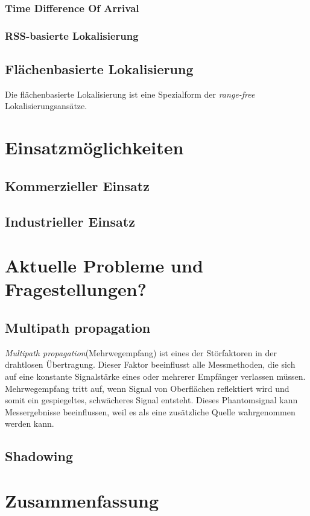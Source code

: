 \documentclass[12pt, a4wide]{scrreprt}
\begin{document}
    \subsection{Time Difference Of Arrival}
    \subsection{RSS-basierte Lokalisierung}    
  \section{Flächenbasierte Lokalisierung}
Die flächenbasierte Lokalisierung ist eine Spezialform der \textit{range-free} Lokalisierungsansätze.
\chapter{Einsatzmöglichkeiten}
  \section{Kommerzieller Einsatz}
  \section{Industrieller Einsatz}

\chapter{Aktuelle Probleme und Fragestellungen?}
  \section{Multipath propagation}
\textit{Multipath propagation}(Mehrwegempfang) ist eines der Störfaktoren in der drahtlosen Übertragung. Dieser Faktor beeinflusst alle Messmethoden, die sich auf eine konstante Signalstärke eines oder mehrerer Empfänger verlassen müssen. Mehrwegempfang tritt auf, wenn Signal von Oberflächen reflektiert wird und somit ein gespiegeltes, schwächeres Signal entsteht. Dieses Phantomsignal kann Messergebnisse beeinflussen, weil es als eine zusätzliche Quelle wahrgenommen werden kann.
  \section{Shadowing}

\chapter{Zusammenfassung}
\newpage

\pagestyle{empty}

\nocite{*}
\end{document}

